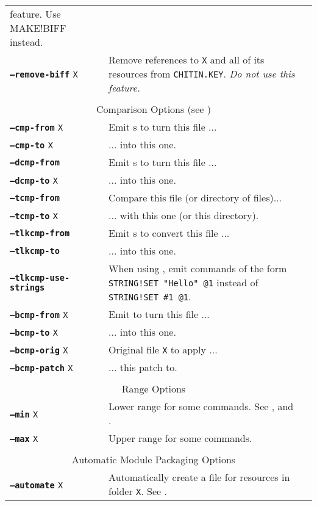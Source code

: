 \documentclass{article}
\def\ttref#1{\ahrefloc{#1}{\tt #1}}
\def\DEFINE#1{{\tt \bf #1}\label{#1}\index{#1}}
\def\t#1{{\tt #1}}
\begin{document}
\begin{tabular}{lp{10in}|p{10in}}
{feature. Use MAKE!BIFF instead.} \\
\DEFINE{--remove-biff} \t{X} & Remove references to \ttref{BIFF} \t{X} and
all of its resources from \t{CHITIN.KEY}. \emph{Do not use this feature.} \\
\\
\multicolumn{2}{c}{ {\color{red} Comparison Options} (see \ttref{--out})} \\
\DEFINE{--cmp-from} \t{X}&	Emit \ttref{WRITE!BYTE}s to turn this file ... \\
\DEFINE{--cmp-to}   \t{X}&	... into this one. \\
\DEFINE{--dcmp-from}\t{X}&	Emit \ttref{REPLACE}s to turn this \ttref{DLG} file ... \\
\DEFINE{--dcmp-to}  \t{X}&	... into this one. \\
\DEFINE{--tcmp-from}\t{X}&	Compare this \ttref{TRA} file (or directory of \ttref{TRA }files)... \\
\DEFINE{--tcmp-to}  \t{X}&	... with this one (or this directory). \\
\DEFINE{--tlkcmp-from}\t{X}&	Emit \ttref{STRING!SET}s to convert this \ttref{TLK} file ... \\
\DEFINE{--tlkcmp-to}\t{X}&	... into this one. \\
\DEFINE{--tlkcmp-use-strings} & When using \ttref{--tlkcmp-from}, emit
commands of the form \t{STRING!SET "Hello" @1} instead of \t{STRING!SET \#1
@1}. \\
\DEFINE{--bcmp-from}  \t{X}&      Emit \ttref{APPLY!BCS!PATCH} to turn this
\ttref{BCS} file ... \\
\DEFINE{--bcmp-to}    \t{X}&      ... into this one. \\
\DEFINE{--bcmp-orig}  \t{X}&      Original file \t{X} to apply ... \\
\DEFINE{--bcmp-patch} \t{X}&      ... this patch to. \\
\\
\multicolumn{2}{c}{ \color{red} Range Options} \\
\DEFINE{--min} \t{X} & Lower range for some commands. See
\ttref{--traify-tlk}, \ttref{--tlkcmp-from} and \ttref{--string}.  \\
\DEFINE{--max} \t{X} & Upper range for some commands. \\
\\
\multicolumn{2}{c}{ \color{red} Automatic Module Packaging Options} \\
\DEFINE{--automate} \t{X}&   Automatically create a \ttref{TP2} file for resources in folder \t{X}. See \ttref{--out}. \\

\end{tabular}
\end{document}
